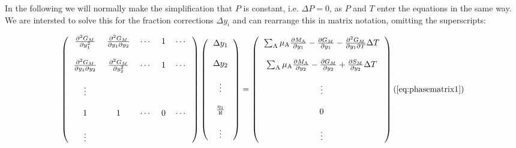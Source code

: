 \documentclass[12pt]{article}
\begin{document}
In the following we will normally make the simplification that $P$ is
constant, i.e. $\Delta P=0$, as $P$ and $T$ enter the equations in the
same way.  We are intersted to solve this for the fraction corrections
$\Delta y_i$ and can rearrange this in matrix notation, omitting the
superscripts:

\label{eq:phasematrix1}

\[
\left(
\begin{tabular}{ccccc}
$\frac{\partial^2 G_M}{\partial y^2_1}$ &
$\frac{\partial^2 G_M}{\partial y_1\partial y_2}$ & $\cdots$ & 1 & $\cdots$ \\
\\
$\frac{\partial^2 G_M}{\partial y_1\partial y_2}$ &
$\frac{\partial^2 G_M}{\partial y^2_2}$ & $\cdots$ & 1 & $\cdots$ \\
\\
$\vdots$ \\
\\
1 & 1 & $\cdots$ & 0 & $\cdots$ \\
\\
$\vdots$\\
\end{tabular}
\right)
\left(
\begin{tabular}{c}
$\Delta y_1$\\
\\
$\Delta y_2$\\
\\
$\vdots$\\
\\
$\frac{\eta_1}{\aleph}$\\
\\
$\vdots$\\
\end{tabular}
\right)
=
\left(
\begin{tabular}{c}
$\sum_{\rm A} \mu_{\rm A}
\frac{\partial M_{\rm A}}{\partial y_1}
-\frac{\partial G_M}{\partial y_1}
-\frac{\partial^2 G_M}{\partial y_1\partial T}\Delta T$\\
\\
$\sum_{\rm A} \mu_{\rm A}
\frac{\partial M_{\rm A}}{\partial y_2}
-\frac{\partial G_M}{\partial y_2}+
\frac{\partial S_M}{\partial y_2}\Delta T$\\
\\
$\vdots$\\
\\
0\\
\\
$\vdots$\\
\end{tabular}
\right)
\\
\\ (\ref{eq:phasematrix1})
\]
\end{document}
